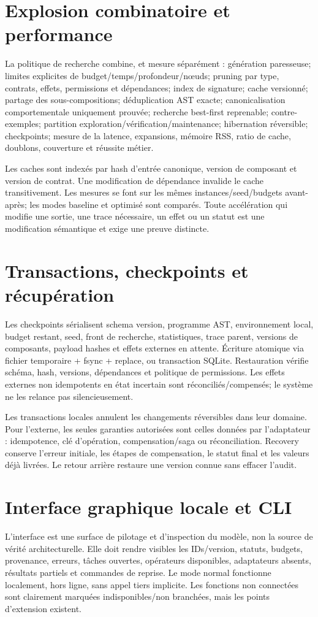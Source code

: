 \documentclass[10pt,a4paper]{article}
\begin{document}
\section{Explosion combinatoire et performance}
La politique de recherche combine, et mesure séparément : génération paresseuse; limites explicites de budget/temps/profondeur/nœuds; pruning par type, contrats, effets, permissions et dépendances; index de signature; cache versionné; partage des sous-compositions; déduplication AST exacte; canonicalisation comportementale uniquement prouvée; recherche best-first reprenable; contre-exemples; partition exploration/vérification/maintenance; hibernation réversible; checkpoints; mesure de la latence, expansions, mémoire RSS, ratio de cache, doublons, couverture et réussite métier.

Les caches sont indexés par hash d'entrée canonique, version de composant et version de contrat. Une modification de dépendance invalide le cache transitivement. Les mesures se font sur les mêmes instances/seed/budgets avant-après; les modes baseline et optimisé sont comparés. Toute accélération qui modifie une sortie, une trace nécessaire, un effet ou un statut est une modification sémantique et exige une preuve distincte.

\section{Transactions, checkpoints et récupération}
Les checkpoints sérialisent schema version, programme AST, environnement local, budget restant, seed, front de recherche, statistiques, trace parent, versions de composants, payload hashes et effets externes en attente. Écriture atomique via fichier temporaire + fsync + replace, ou transaction SQLite. Restauration vérifie schéma, hash, versions, dépendances et politique de permissions. Les effets externes non idempotents en état incertain sont réconciliés/compensés; le système ne les relance pas silencieusement.

Les transactions locales annulent les changements réversibles dans leur domaine. Pour l'externe, les seules garanties autorisées sont celles données par l'adaptateur : idempotence, clé d'opération, compensation/saga ou réconciliation. Recovery conserve l'erreur initiale, les étapes de compensation, le statut final et les valeurs déjà livrées. Le retour arrière restaure une version connue sans effacer l'audit.

\section{Interface graphique locale et CLI}
L'interface est une surface de pilotage et d'inspection du modèle, non la source de vérité architecturelle. Elle doit rendre visibles les IDs/version, statuts, budgets, provenance, erreurs, tâches ouvertes, opérateurs disponibles, adaptateurs absents, résultats partiels et commandes de reprise. Le mode normal fonctionne localement, hors ligne, sans appel tiers implicite. Les fonctions non connectées sont clairement marquées indisponibles/non branchées, mais les points d'extension existent.
\end{document}

